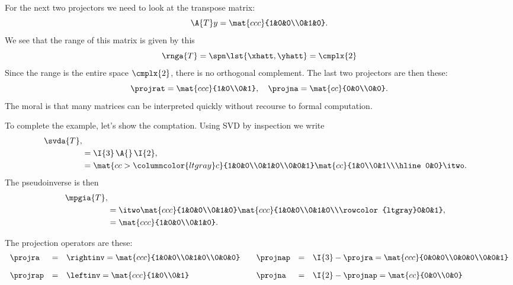 For the next two projectors we need to look at the transpose matrix:
\begin{equation}
  \A{T}y = \mat{ccc}{1&0&0\\0&1&0}.
\end{equation}
We see that the range of this matrix is given by this
\begin{equation}
  \rnga{T} = \spn \lst{\xhatt,\yhatt} = \cmplx{2}
\end{equation}
Since the range is the entire space $\cmplx{2}$, there is no orthogonal complement.
The last two projectors are then these:
\begin{equation}
  \projrat = \mat{ccc}{1&0\\0&1}, \quad \projna = \mat{cc}{0&0\\0&0}.
\end{equation}
The moral is that many matrices can be interpreted quickly without recourse to formal computation.

To complete the example, let's show the comptation. Using SVD by inspection we write
\begin{equation}
\begin{split}
  \svda{T},\\
  &= \I{3}\, \A{}\, \I{2},\\
  &= \mat{cc>{\columncolor{ltgray}}c}{1&0&0\\0&1&0\\0&0&1} \mat{cc}{1&0\\0&1\\\hline0&0} \itwo.
\end{split}
\end{equation}
The pseudoinverse is then
\begin{equation}
  \begin{split}
     \mpgia{T}, \\
     & = \itwo \mat{ccc}{1&0&0\\0&1&0} \mat{ccc}{1&0&0\\0&1&0\\\rowcolor{ltgray}0&0&1},\\
     & = \mat{ccc}{1&0&0\\0&1&0}.
  \end{split}
\end{equation}

The projection operators are these:
\begin{equation}
  \begin{array}{lcllcl}
    \projra& = &\rightinv = \mat{ccc}{1&0&0\\0&1&0\\0&0&0} & \quad \projnap& = &\I{3}-\projra = \mat{ccc}{0&0&0\\0&0&0\\0&0&1}\\[10pt]
    \projrap& =& \leftinv = \mat{ccc}{1&0\\0&1} & \quad \projna& = &\I{2}-\projnap = \mat{cc}{0&0\\0&0}\\    
  \end{array}
  \label{eq:primitives}
\end{equation}

